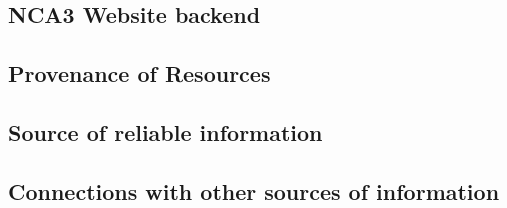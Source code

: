 \documentclass{beamer}
\begin{document}
\subsection{NCA3 Website backend}

\subsection{Provenance of Resources}

\subsection{Source of reliable information}

\subsection{Connections with other sources of information}
\end{document}
